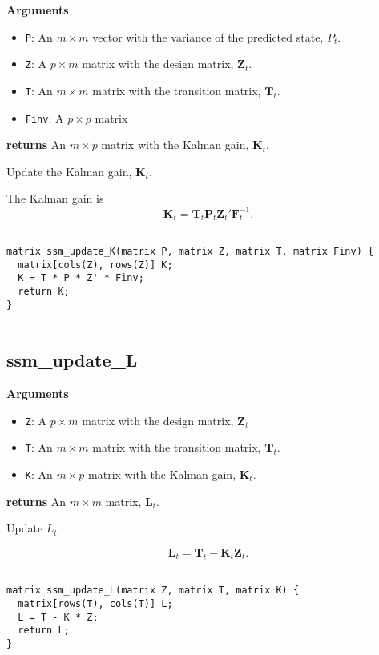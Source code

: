 \documentclass[]{book}
\providecommand{\tightlist}{%
  \setlength{\itemsep}{0pt}\setlength{\parskip}{0pt}}
\newcommand{\mat}[1]{\boldsymbol{#1}}
\begin{document}
\textbf{Arguments}

\begin{itemize}
\tightlist
\item
  \texttt{P}: An \(m \times m\) vector with the variance of the
  predicted state, \(P_t\).
\item
  \texttt{Z}: A \(p \times m\) matrix with the design matrix,
  \(\mat{Z}_t\).
\item
  \texttt{T}: An \(m \times m\) matrix with the transition matrix,
  \(\mat{T}_t\).
\item
  \texttt{Finv}: A \(p \times p\) matrix
\end{itemize}

\textbf{returns} An \(m \times p\) matrix with the Kalman gain,
\(\mat{K}_t\).

Update the Kalman gain, \(\mat{K}_t\).

The Kalman gain is \[
\mat{K}_t = \mat{T}_t \mat{P}_t \mat{Z}_t' \mat{F}^{-1}_t .
\]

\begin{verbatim}

matrix ssm_update_K(matrix P, matrix Z, matrix T, matrix Finv) {
  matrix[cols(Z), rows(Z)] K;
  K = T * P * Z' * Finv;
  return K;
}


\end{verbatim}

\subsection{ssm\_update\_L}\label{ssm_update_l}

\textbf{Arguments}

\begin{itemize}
\tightlist
\item
  \texttt{Z}: A \(p \times m\) matrix with the design matrix,
  \(\mat{Z}_t\)
\item
  \texttt{T}: An \(m \times m\) matrix with the transition matrix,
  \(\mat{T}_t\).
\item
  \texttt{K}: An \(m \times p\) matrix with the Kalman gain,
  \(\mat{K}_t\).
\end{itemize}

\textbf{returns} An \(m \times m\) matrix, \(\mat{L}_t\).

Update \(L_t\)

\[
\mat{L}_t = \mat{T}_t - \mat{K}_t \mat{Z}_t .
\]

\begin{verbatim}

matrix ssm_update_L(matrix Z, matrix T, matrix K) {
  matrix[rows(T), cols(T)] L;
  L = T - K * Z;
  return L;
}


\end{verbatim}
\end{document}
